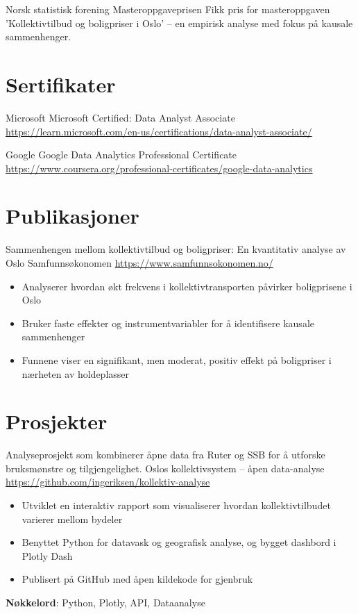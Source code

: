 \documentclass[a4paper, serif, 10pt]{moderncv}
\begin{document}
        {Norsk statistisk forening}
        {Masteroppgaveprisen}
        {}
        {}
        {Fikk pris for masteroppgaven 'Kollektivtilbud og boligpriser i Oslo' – en empirisk analyse med fokus på kausale sammenhenger.}
\section{Sertifikater}

        {Microsoft}
        {Microsoft Certified: Data Analyst Associate}
        {\url{https://learn.microsoft.com/en-us/certifications/data-analyst-associate/}}
        {}
        {}

        {Google}
        {Google Data Analytics Professional Certificate}
        {\url{https://www.coursera.org/professional-certificates/google-data-analytics}}
        {}
        {}
\section{Publikasjoner}

        {Sammenhengen mellom kollektivtilbud og boligpriser: En kvantitativ analyse av Oslo}
        {Samfunnsøkonomen}
        {\url{https://www.samfunnsokonomen.no/}}
        {}
        {\begin{itemize}
\item Analyserer hvordan økt frekvens i kollektivtransporten påvirker boligprisene i Oslo
\item Bruker faste effekter og instrumentvariabler for å identifisere kausale sammenhenger
\item Funnene viser en signifikant, men moderat, positiv effekt på boligpriser i nærheten av holdeplasser
\end{itemize}}
\section{Prosjekter}

        {Analyseprosjekt som kombinerer åpne data fra Ruter og SSB for å utforske bruksmønstre og tilgjengelighet.}
        {Oslos kollektivsystem – åpen data-analyse}
        {\url{https://github.com/ingeriksen/kollektiv-analyse}}
        {}
        {\begin{itemize}
\item Utviklet en interaktiv rapport som visualiserer hvordan kollektivtilbudet varierer mellom bydeler
\item Benyttet Python for datavask og geografisk analyse, og bygget dashbord i Plotly Dash
\item Publisert på GitHub med åpen kildekode for gjenbruk
\end{itemize}
\textbf{Nøkkelord}: Python, Plotly, API, Dataanalyse}
\end{document}
